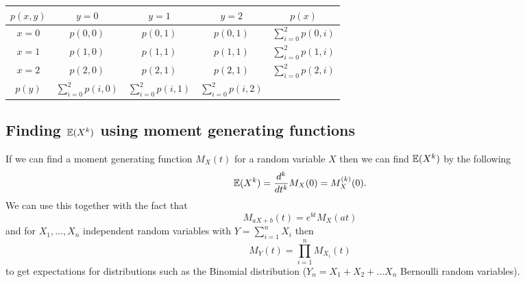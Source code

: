 \documentclass[10pt, a4paper]{article}
\begin{document}
\begin{example}
    \begin{table}[H]
        \centering
        \begin{tabular}{c|ccc|c}
             $p(x, y)$ & $y = 0$ & $y = 1$ & $y = 2$ & $p(x)$  \\
             \hline
             $x = 0$ & $p(0, 0)$ & $p(0, 1)$ & $p(0, 1)$ & $\sum_{i = 0}^{2}p(0, i)$ \\
             $x = 1$ & $p(1, 0)$ & $p(1, 1)$ & $p(1, 1)$ & $\sum_{i = 0}^{2}p(1, i)$ \\
             $x = 2$ & $p(2, 0)$ & $p(2, 1)$ & $p(2, 1)$ & $\sum_{i = 0}^{2}p(2, i)$ \\
             \hline
             $p(y)$ & $\sum_{i = 0}^{2}p(i, 0)$ & $\sum_{i = 0}^{2}p(i, 1)$ & $\sum_{i = 0}^{2}p(i, 2)$ &
        \end{tabular}
    \end{table}
\end{example}

\subsection{Finding \texorpdfstring{$\mathbb{E}(X ^ k)$}{} using moment generating functions}
If we can find a moment generating function $M_X(t)$ for a random variable $X$ then we can find $\mathbb{E}(X ^ k)$ by the following
\[
\mathbb{E}(X ^ k) = \frac{d ^ k}{dt ^ k}M_X(0) = M_X ^ {(k)}(0).
\]
We can use this together with the fact that
\[
M_{aX + b}(t) = e ^ {bt}M_X(at)
\]
and for $X_1, \dotsc, X_n$ independent random variables with $Y = \sum_{i = 1}^{n}X_i$ then
\[
M_Y(t) = \prod_{i = 1}^{n}M_{X_i}(t)
\]
to get expectations for distributions such as the Binomial distribution
($Y_n = X_1 + X_2 + \dotsc X_n$ Bernoulli random variables).
\end{document}
